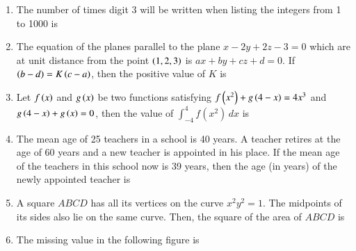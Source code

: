 \documentclass[journal,12pt,onecolumn]{IEEEtran}
\theoremstyle{remark}
\begin{document}
\begin{enumerate}
\begin{enumerate}
\end{enumerate}

  


\item The number of times digit 3 will be written when listing the integers from 1 to 1000 is \underline{\hspace{1cm}}
\\ 
\item The equation of the planes parallel to the plane $x - 2y + 2z - 3 = 0$ which are at unit distance from the point $\left(1, 2, 3\right)$ is $ax + by + cz + d = 0$. If $\left(b - d\right) = K\left(c - a\right)$, then the positive value of $K$ is \underline{\hspace{1cm}}
\\
\item Let $f\left(x\right)$ and $g\left(x\right)$ be two functions satisfying $f\left(x^2\right) + g\left(4 - x\right) = 4x^3$ and $g\left(4 - x\right) + g\left(x\right) = 0$, then the value of $\int_{-4}^{4} f(x^2) \, dx$ is \underline{\hspace{1cm}}
\\
\item The mean age of 25 teachers in a school is 40 years. A teacher retires at the age of 60 years and a new teacher is appointed in his place. If the mean age of the teachers in this school now is 39 years, then the age (in years) of the newly appointed teacher is \underline{\hspace{1cm}}
\\

\item A square $ABCD$ has all its vertices on the curve $x^2y^2 = 1$. The midpoints of its sides also lie on the same curve. Then, the square of the area of $ABCD$ is \underline{\hspace{1cm}}
\\
\item The missing value in the following figure is \underline{\hspace{1cm}}



 \begin{center}
     

\end{center}
\end{enumerate}
\end{document}
